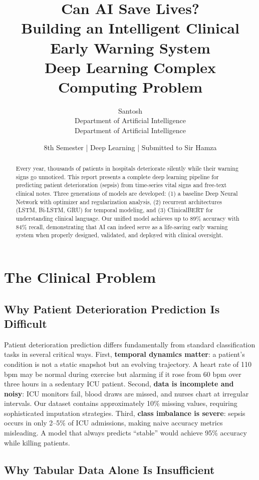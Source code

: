\documentclass[11pt,a4paper]{article}
\title{\textbf{Can AI Save Lives?}\\\vspace{0.3cm}
\large Building an Intelligent Clinical Early Warning System\\\vspace{0.2cm}
\normalsize Deep Learning Complex Computing Problem}
\author{Santosh\\Department of Artificial Intelligence\\Department of Artificial Intelligence}
\date{8th Semester | Deep Learning | Submitted to Sir Hamza}
\begin{document}
\maketitle

\begin{abstract}
\noindent Every year, thousands of patients in hospitals deteriorate silently while their warning signs go unnoticed. This report presents a complete deep learning pipeline for predicting patient deterioration (sepsis) from time-series vital signs and free-text clinical notes. Three generations of models are developed: (1) a baseline Deep Neural Network with optimizer and regularization analysis, (2) recurrent architectures (LSTM, Bi-LSTM, GRU) for temporal modeling, and (3) ClinicalBERT for understanding clinical language. Our unified model achieves up to 89\% accuracy with 84\% recall, demonstrating that AI can indeed serve as a life-saving early warning system when properly designed, validated, and deployed with clinical oversight.
\end{abstract}

\section{The Clinical Problem}

\subsection{Why Patient Deterioration Prediction Is Difficult}

Patient deterioration prediction differs fundamentally from standard classification tasks in several critical ways. First, \textbf{temporal dynamics matter}: a patient's condition is not a static snapshot but an evolving trajectory. A heart rate of 110 bpm may be normal during exercise but alarming if it rose from 60 bpm over three hours in a sedentary ICU patient. Second, \textbf{data is incomplete and noisy}: ICU monitors fail, blood draws are missed, and nurses chart at irregular intervals. Our dataset contains approximately 10\% missing values, requiring sophisticated imputation strategies. Third, \textbf{class imbalance is severe}: sepsis occurs in only 2--5\% of ICU admissions, making naive accuracy metrics misleading. A model that always predicts ``stable'' would achieve 95\% accuracy while killing patients.

\subsection{Why Tabular Data Alone Is Insufficient}
\end{document}
